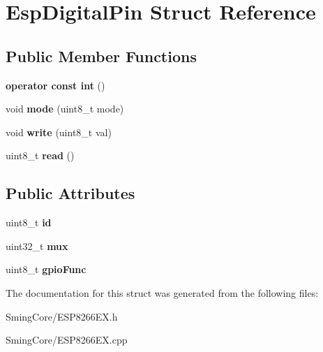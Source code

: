 \hypertarget{struct_esp_digital_pin}{}\section{Esp\+Digital\+Pin Struct Reference}
\label{struct_esp_digital_pin}
\subsection*{Public Member Functions}
\begin{DoxyCompactItemize}
\item 
\hypertarget{struct_esp_digital_pin_a71781517b5a9fda73c20d4b12e7ef001}{}{\bfseries operator const int} ()\label{struct_esp_digital_pin_a71781517b5a9fda73c20d4b12e7ef001}

\item 
\hypertarget{struct_esp_digital_pin_abac51068cde6205783b1cc9ab25ff5dc}{}void {\bfseries mode} (uint8\+\_\+t mode)\label{struct_esp_digital_pin_abac51068cde6205783b1cc9ab25ff5dc}

\item 
\hypertarget{struct_esp_digital_pin_a34c567b8e1d4a786e9721f92fa46e8f0}{}void {\bfseries write} (uint8\+\_\+t val)\label{struct_esp_digital_pin_a34c567b8e1d4a786e9721f92fa46e8f0}

\item 
\hypertarget{struct_esp_digital_pin_a46915f0b619f6692a98bac1255f6bbba}{}uint8\+\_\+t {\bfseries read} ()\label{struct_esp_digital_pin_a46915f0b619f6692a98bac1255f6bbba}

\end{DoxyCompactItemize}
\subsection*{Public Attributes}
\begin{DoxyCompactItemize}
\item 
\hypertarget{struct_esp_digital_pin_a3b394ffa61ba1a684eff0f3e2c505aea}{}uint8\+\_\+t {\bfseries id}\label{struct_esp_digital_pin_a3b394ffa61ba1a684eff0f3e2c505aea}

\item 
\hypertarget{struct_esp_digital_pin_ace65e413174da7e2941dc24035d02bae}{}uint32\+\_\+t {\bfseries mux}\label{struct_esp_digital_pin_ace65e413174da7e2941dc24035d02bae}

\item 
\hypertarget{struct_esp_digital_pin_a109e7d4c694bfc34924cbb0f4fe3123c}{}uint8\+\_\+t {\bfseries gpio\+Func}\label{struct_esp_digital_pin_a109e7d4c694bfc34924cbb0f4fe3123c}

\end{DoxyCompactItemize}


The documentation for this struct was generated from the following files\+:\begin{DoxyCompactItemize}
\item 
Sming\+Core/E\+S\+P8266\+E\+X.\+h\item 
Sming\+Core/E\+S\+P8266\+E\+X.\+cpp\end{DoxyCompactItemize}
